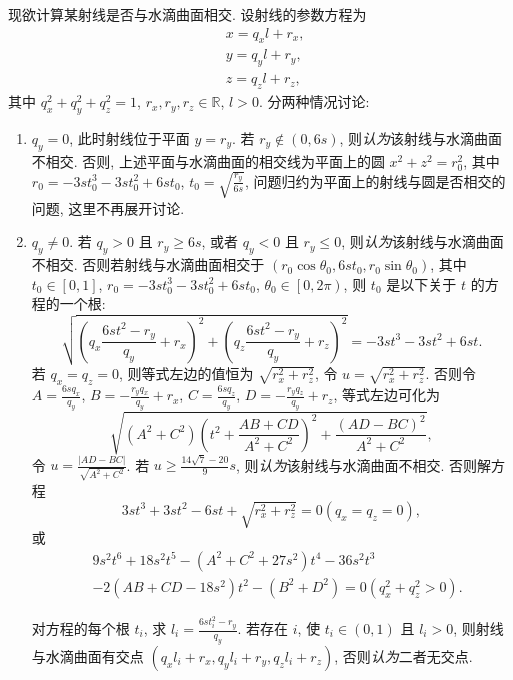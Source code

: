 \documentclass{ctexart}
\begin{document}
现欲计算某射线是否与水滴曲面相交. 设射线的参数方程为
\begin{align*}[left={\empheqlbrace}]
    & x = q_xl+r_x, \\
    & y = q_yl+r_y, \\
    & z = q_zl+r_z,
\end{align*}
其中 $q_x^2+q_y^2+q_z^2=1$, $r_x, r_y, r_z \in\mathbb{R}$, $l>0$. 分两种情况讨论:
\begin{enumerate}[wide]
    \item $q_y=0$, 此时射线位于平面 $y=r_y$. 若 $r_y\notin\left(0, 6s\right)$, 则\emph{认为}该射线与水滴曲面不相交. 否则, 上述平面与水滴曲面的相交线为平面上的圆 $x^2+z^2 = r_0^2$, 其中 $r_0 = -3st_0^3-3st_0^2+6st_0$, $t_0 = \sqrt{\displaystyle\frac{r_y}{6s}}$, 问题归约为平面上的射线与圆是否相交的问题, 这里不再展开讨论.

    \item $q_y\neq{}0$. 若 $q_y>0$ 且 $r_y\ge{}6s$, 或者 $q_y<0$ 且 $r_y\le{}0$, 则\emph{认为}该射线与水滴曲面不相交. 否则若射线与水滴曲面相交于 $\left(r_0\cos{\theta_0}, 6st_0, r_0\sin{\theta_0}\right)$, 其中 $t_0\in\left[0, 1\right]$, $r_0 = -3st_0^3-3st_0^2+6st_0$, $\theta_0\in\left[0, 2\pi\right)$, 则 $t_0$ 是以下关于 $t$ 的方程的一个根: \[
        \sqrt{\left(q_x\frac{6st^2-r_y}{q_y}+r_x\right)^2 + \left(q_z\frac{6st^2-r_y}{q_y}+r_z\right)^2} = -3st^3-3st^2+6st.
    \]
    若 $q_x=q_z=0$, 则等式左边的值恒为 $\sqrt{r_x^2+r_z^2}$, 令 $u=\sqrt{r_x^2+r_z^2}$. 否则令 $A=\displaystyle\frac{6sq_x}{q_y}$, $B=-\displaystyle\frac{r_yq_x}{q_y}+r_x$, $C=\displaystyle\frac{6sq_z}{q_y}$, $D=-\displaystyle\frac{r_yq_z}{q_y}+r_z$, 等式左边可化为 \[
        \sqrt{\left(A^2+C^2\right)\left(t^2+\frac{AB+CD}{A^2+C^2}\right)^2+\frac{\left(AD-BC\right)^2}{A^2+C^2}},
    \]
    令 $u=\displaystyle\frac{\left|AD-BC\right|}{\sqrt{A^2+C^2}}$. 若 $u \ge \displaystyle\frac{14\sqrt{7}-20}{9}s$, 则\emph{认为}该射线与水滴曲面不相交. 否则解方程 \[
        3st^3+3st^2-6st+\sqrt{r_x^2+r_z^2}=0 \left(q_x=q_z=0\right),
    \] 或 \[
    \begin{aligned}
        & 9s^2t^6+18s^2t^5-\left(A^2+C^2+27s^2\right)t^4-36s^2t^3 \\
        & -2\left(AB+CD-18s^2\right)t^2-\left(B^2+D^2\right)=0 \left(q_x^2+q_z^2>0\right).
    \end{aligned} \]

    对方程的每个根 $t_i$, 求 $l_i = \displaystyle\frac{6st_i^2-r_y}{q_y}$. 若存在 $i$, 使 $t_i\in\left(0, 1\right)$ 且 $l_i>0$, 则射线与水滴曲面有交点 $\left(q_xl_i+r_x, q_yl_i+r_y, q_zl_i+r_z\right)$, 否则\emph{认为}二者无交点.

\end{enumerate}
\end{document}
